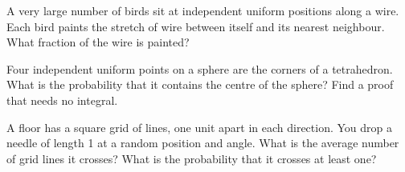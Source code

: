 \begin{question}\label{iq:iv1:continuous-and-geometric-probability:23}
A very large number of birds sit at independent uniform positions along a wire. Each bird paints the stretch of wire between itself and its nearest neighbour. What fraction of the wire is painted?
\end{question}

\begin{question}\label{iq:iv1:continuous-and-geometric-probability:24}
Four independent uniform points on a sphere are the corners of a tetrahedron. What is the probability that it contains the centre of the sphere? Find a proof that needs no integral.
\end{question}

\begin{question}\label{iq:iv1:continuous-and-geometric-probability:25}
A floor has a square grid of lines, one unit apart in each direction. You drop a needle of length 1 at a random position and angle. What is the average number of grid lines it crosses? What is the probability that it crosses at least one?
\end{question}
